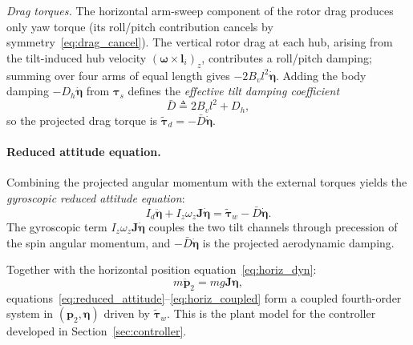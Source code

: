 \noindent\textit{Drag torques.}
The horizontal arm-sweep component of the rotor drag produces only yaw
torque (its roll/pitch contribution cancels by
symmetry~\eqref{eq:drag_cancel}).  The vertical rotor drag at each hub,
arising from the tilt-induced hub velocity $(\boldsymbol{\omega}\times
\boldsymbol{l}_i)_z$, contributes a roll/pitch damping; summing over four
arms of equal length gives $-2B_v l^2\dot{\boldsymbol{\eta}}$.  Adding the
body damping $-D_h\dot{\boldsymbol{\eta}}$ from $\boldsymbol{\tau}_s$ defines
the \emph{effective tilt damping coefficient}
\begin{equation}
    \bar{D} \triangleq 2B_v l^2 + D_h,
    \label{eq:Dbar}
\end{equation}
so the projected drag torque is $\tilde{\boldsymbol{\tau}}_d =
-\bar{D}\dot{\boldsymbol{\eta}}$.

\paragraph{Reduced attitude equation.}
Combining the projected angular momentum with the external torques yields
the \emph{gyroscopic reduced attitude equation}:
\begin{equation}
    I_d\ddot{\boldsymbol{\eta}}
        + I_z\omega_z\boldsymbol{J}\dot{\boldsymbol{\eta}}
        = \tilde{\boldsymbol{\tau}}_w
          - \bar{D}\dot{\boldsymbol{\eta}} .
    \label{eq:reduced_attitude}
\end{equation}
The gyroscopic term $I_z\omega_z\boldsymbol{J}\dot{\boldsymbol{\eta}}$
couples the two tilt channels through precession of the spin angular momentum,
and $-\bar{D}\dot{\boldsymbol{\eta}}$ is the projected aerodynamic damping.

Together with the horizontal position equation~\eqref{eq:horiz_dyn}:
\begin{equation}
    m\ddot{\boldsymbol{p}}_2 = mg\boldsymbol{J}\boldsymbol{\eta},
    \label{eq:horiz_coupled}
\end{equation}
equations~\eqref{eq:reduced_attitude}--\eqref{eq:horiz_coupled} form a
coupled fourth-order system in $(\boldsymbol{p}_2,\boldsymbol{\eta})$ driven
by $\tilde{\boldsymbol{\tau}}_w$.  This is the plant model for the controller
developed in Section~\ref{sec:controller}.

